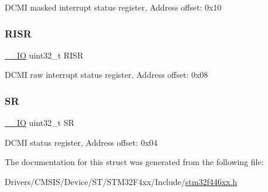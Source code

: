 D\+C\+MI masked interrupt status register, Address offset\+: 0x10 \mbox{\label{struct_d_c_m_i___type_def_aa196fddf0ba7d6e3ce29bdb04eb38b94}} 
\subsubsection{\texorpdfstring{R\+I\+SR}{RISR}}
{\footnotesize\ttfamily \mbox{\hyperlink{core__sc300_8h_aec43007d9998a0a0e01faede4133d6be}{\+\_\+\+\_\+\+IO}} uint32\+\_\+t R\+I\+SR}

D\+C\+MI raw interrupt status register, Address offset\+: 0x08 \mbox{\label{struct_d_c_m_i___type_def_af6aca2bbd40c0fb6df7c3aebe224a360}} 
\subsubsection{\texorpdfstring{SR}{SR}}
{\footnotesize\ttfamily \mbox{\hyperlink{core__sc300_8h_aec43007d9998a0a0e01faede4133d6be}{\+\_\+\+\_\+\+IO}} uint32\+\_\+t SR}

D\+C\+MI status register, Address offset\+: 0x04 

The documentation for this struct was generated from the following file\+:\begin{DoxyCompactItemize}
\item 
Drivers/\+C\+M\+S\+I\+S/\+Device/\+S\+T/\+S\+T\+M32\+F4xx/\+Include/\mbox{\hyperlink{stm32f446xx_8h}{stm32f446xx.\+h}}\end{DoxyCompactItemize}
